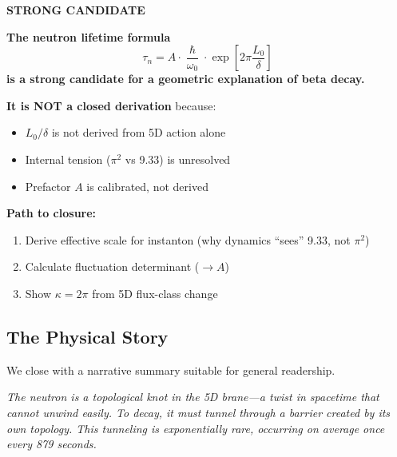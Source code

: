 \documentclass[11pt,a4paper]{article}
\newcommand{\hbar}{\hslash}
\begin{document}
\begin{tcolorbox}[colback=blue!5!white, colframe=blue!50!black, title=Final Verdict]
\begin{center}
\Large\textbf{STRONG CANDIDATE}
\end{center}

\textbf{The neutron lifetime formula}
\begin{equation}
\tau_n = A \cdot \frac{\hbar}{\omega_0} \cdot \exp\left[2\pi \frac{L_0}{\delta}\right]
\end{equation}
\textbf{is a strong candidate for a geometric explanation of beta decay.}

\vspace{0.5em}
\textbf{It is NOT a closed derivation} because:
\begin{itemize}[nosep]
\item $L_0/\delta$ is not derived from 5D action alone
\item Internal tension ($\pi^2$ vs 9.33) is unresolved
\item Prefactor $A$ is calibrated, not derived
\end{itemize}

\vspace{0.5em}
\textbf{Path to closure:}
\begin{enumerate}[nosep]
\item Derive effective scale for instanton (why dynamics ``sees'' 9.33, not $\pi^2$)
\item Calculate fluctuation determinant ($\to A$)
\item Show $\kappa = 2\pi$ from 5D flux-class change
\end{enumerate}
\end{tcolorbox}

\subsection{The Physical Story}

We close with a narrative summary suitable for general readership.

\vspace{1em}
\noindent\textit{The neutron is a topological knot in the 5D brane---a twist in spacetime that cannot unwind easily. To decay, it must tunnel through a barrier created by its own topology. This tunneling is exponentially rare, occurring on average once every 879 seconds.}
\end{document}

